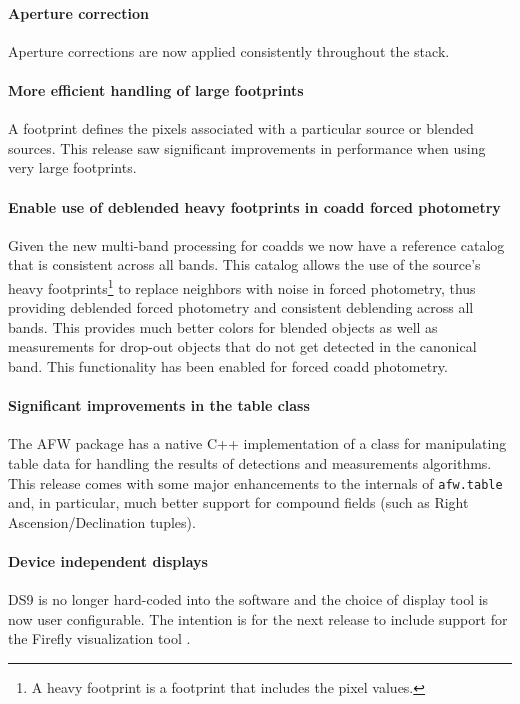 \documentclass[11pt,twoside]{article}
\begin{document}
\paragraph{Aperture correction} Aperture corrections are now applied
consistently throughout the stack.

\paragraph{More efficient handling of large footprints} A footprint
defines the pixels associated with a particular source or blended
sources. This release saw significant improvements in performance when
using very large footprints.

\paragraph{Enable use of deblended heavy footprints in coadd forced
  photometry} Given the new multi-band processing for coadds we now
have a reference catalog that is consistent across all bands. This
catalog allows the use of the source's heavy footprints\footnote{A
  heavy footprint is a footprint that includes the pixel values.} to
replace neighbors with noise in forced photometry, thus providing
deblended forced photometry and consistent deblending across all
bands. This provides much better colors for blended objects as well as
measurements for drop-out objects that do not get detected in the
canonical band. This functionality has been enabled for forced coadd
photometry.

\paragraph{Significant improvements in the table class} The AFW package
has a native C++ implementation of a class for manipulating table data
for handling the results of detections and measurements
algorithms. This release comes with some major enhancements to the
internals of \texttt{afw.table} and, in particular, much better
support for compound fields (such as Right Ascension/Declination tuples).

\paragraph{Device independent displays} DS9
\citep{2011ASPC..442..633J} is no longer hard-coded into the software
and the choice of display tool is now user configurable.  The
intention is for the next release to include support for the Firefly
visualization tool \citep{O10-1_adassxxv}.
\end{document}
